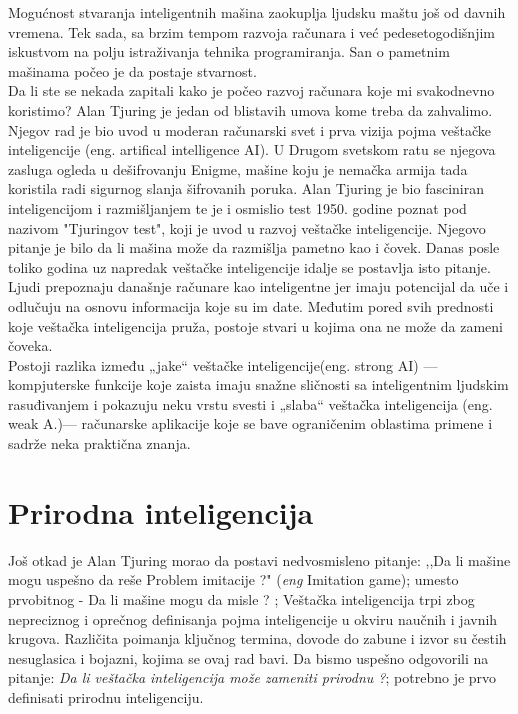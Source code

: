 \documentclass[a4paper]{article}
\begin{document}
Mogućnost stvaranja inteligentnih mašina zaokuplja ljudsku maštu još od davnih vremena. Tek sada, sa brzim tempom razvoja računara i već pedesetogodišnjim iskustvom na polju istraživanja tehnika programiranja. San o pametnim mašinama počeo je da postaje stvarnost.\\
Da li ste se nekada zapitali kako je počeo razvoj računara koje mi svakodnevno koristimo? Alan Tjuring je jedan od blistavih umova kome treba da zahvalimo.  Njegov rad je bio uvod u moderan računarski svet i prva vizija pojma veštačke inteligencije (eng. artifical intelligence AI). U Drugom svetskom ratu se njegova zasluga ogleda u dešifrovanju Enigme, mašine koju je nemačka armija tada koristila radi sigurnog slanja šifrovanih poruka. Alan Tjuring je bio fasciniran inteligencijom i razmišljanjem te je i osmislio test 1950. godine poznat pod nazivom "Tjuringov test", koji je uvod u razvoj veštačke inteligencije. Njegovo pitanje je bilo da li mašina može da razmišlja pametno kao i čovek. Danas posle toliko godina uz napredak veštačke inteligencije idalje se postavlja isto pitanje. Ljudi prepoznaju današnje računare kao inteligentne jer imaju potencijal da uče i odlučuju na osnovu informacija koje su im date. Međutim pored svih prednosti koje veštačka inteligencija pruža, postoje stvari u kojima ona ne može da zameni čoveka.\\ 
Postoji razlika između „jake“ veštačke inteligencije(eng. strong AI) — kompjuterske funkcije koje zaista imaju snažne sličnosti sa inteligentnim ljudskim rasuđivanjem i pokazuju neku vrstu  svesti  i „slaba“ veštačka inteligencija (eng. weak A.)— računarske aplikacije koje se bave ograničenim oblastima primene i sadrže neka praktična znanja. 

\newpage
\section{Prirodna inteligencija}
\label{poglavlje:prirodnaInt}
Još otkad je Alan Tjuring morao da postavi nedvosmisleno pitanje: ,,Da li mašine mogu uspešno da reše Problem imitacije ?" (\emph{eng} Imitation game); umesto prvobitnog - Da li mašine mogu da misle ? \cite{turing2009computing}; Veštačka inteligencija trpi zbog nepreciznog i oprečnog definisanja pojma inteligencije u okviru naučnih i javnih krugova. Različita poimanja ključnog termina, dovode do zabune i izvor su čestih nesuglasica i bojazni, kojima se ovaj rad bavi. Da bismo uspešno odgovorili na pitanje: \textit{Da li veštačka inteligencija može zameniti prirodnu ?}; potrebno je prvo definisati prirodnu inteligenciju.
\end{document}
